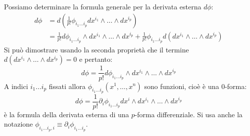 Possiamo determinare la formula generale per la derivata esterna $d\phi:$
\begin{align*}
    d\phi &= d(\frac{1}{p!}\phi_{i_1 \dots i_p} dx^{i_1} \wedge \dots \wedge dx^{i_p}) \\
    &= \frac{1}{p!} d\phi_{i_1 \dots i_p} \wedge dx^{i_1} \wedge \dots \wedge dx^{i_p} + \frac{1}{p!}\phi_{i_1 \dots i_p} d(dx^{i_1} \wedge \dots \wedge dx^{i_p})
\end{align*}
    Si può dimostrare usando la seconda proprietà che il termine $d(dx^{i_1} \wedge \dots \wedge dx^{i_p})=0$ e pertanto:
\begin{equation*}
    d\phi = \frac{1}{p!} d\phi_{i_1 \dots i_p} \wedge dx^{i_1} \wedge \dots \wedge dx^{i_p}
\end{equation*}
    A indici $i_1 \dots i_p$ fissati allora $\phi_{i_1 \dots i_p}(x^1, \dots , x^n)$ sono funzioni, cioè è una 0-forma:
\begin{equation}
    d\phi = \frac{1}{p!}\partial_i \phi_{i_1 \dots i_p} dx^i \wedge dx^{i_1} \wedge \dots \wedge dx^{i_p}
    \label{eq.derivesterna}
\end{equation}
è la formula della derivata esterna di una $p$-forma differenziale. Si usa anche la notazione $\phi_{i_1 \dots i_p, i} \equiv \partial_i \phi_{i_1 \dots i_p}$.



